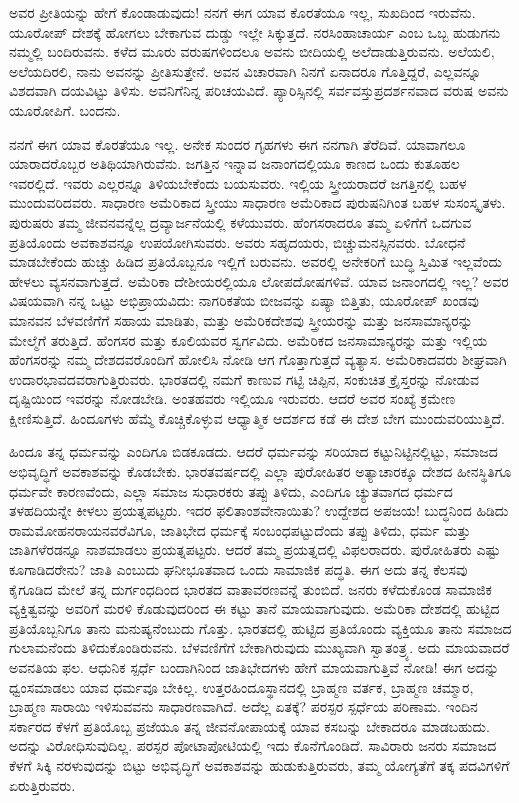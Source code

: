 ಅವರ ಪ್ರೀತಿಯನ್ನು ಹೇಗೆ ಕೊಂಡಾಡುವುದು! ನನಗೆ ಈಗ ಯಾವ ಕೊರತೆಯೂ ಇಲ್ಲ, ಸುಖದಿಂದ ಇರುವೆನು. ಯೂರೋಪ್ ದೇಶಕ್ಕೆ ಹೋಗಲು ಬೇಕಾಗುವ ದುಡ್ಡು ಇಲ್ಲೇ ಸಿಕ್ಕುತ್ತದೆ. ನರಸಿಂಹಾಚಾರ್ಯ ಎಂಬ ಒಬ್ಬ ಹುಡುಗನು ನಮ್ಮಲ್ಲಿ ಬಂದಿರುವನು. ಕಳೆದ ಮೂರು ವರುಷಗಳಿಂದಲೂ ಅವನು ಬೀದಿಯಲ್ಲಿ ಅಲೆದಾಡುತ್ತಿರುವನು. ಅಲೆಯಲಿ, ಅಲೆಯದಿರಲಿ, ನಾನು ಅವನನ್ನು ಪ್ರೀತಿಸುತ್ತೇನೆ. ಅವನ ವಿಚಾರವಾಗಿ ನಿನಗೆ ಏನಾದರೂ ಗೊತ್ತಿದ್ದರೆ, ಎಲ್ಲವನ್ನೂ ವಿಶದವಾಗಿ ದಯವಿಟ್ಟು ತಿಳಿಸು. ಅವನಿಗೆ\break ನಿನ್ನ ಪರಿಚಯವಿದೆ. ಪ್ಯಾರಿಸ್ಸಿನಲ್ಲಿ ಸರ್ವವಸ್ತುಪ್ರದರ್ಶನವಾದ ವರುಷ ಅವನು ಯೂರೋಪಿಗೆ. ಬಂದನು.

ನನಗೆ ಈಗ ಯಾವ ಕೊರತೆಯೂ ಇಲ್ಲ. ಅನೇಕ ಸುಂದರ ಗೃಹಗಳು ಈಗ ನನಗಾಗಿ ತೆರೆದಿವೆ. ಯಾವಾಗಲೂ ಯಾರಾದರೊಬ್ಬರ ಅತಿಥಿಯಾಗಿರುವೆನು. ಜಗತ್ತಿನ ಇನ್ನಾವ ಜನಾಂಗದಲ್ಲಿಯೂ ಕಾಣದ ಒಂದು ಕುತೂಹಲ ಇವರಲ್ಲಿದೆ. ಇವರು ಎಲ್ಲರನ್ನೂ ತಿಳಿಯಬೇಕೆಂದು ಬಯಸುವರು. ಇಲ್ಲಿಯ ಸ್ತ್ರೀಯರಾದರೆ ಜಗತ್ತಿನಲ್ಲಿ ಬಹಳ ಮುಂದುವರಿದವರು. ಸಾಧಾರಣ ಅಮೆರಿಕಾದ ಸ್ತ್ರೀಯು ಸಾಧಾರಣ ಅಮೆರಿಕಾದ ಪುರುಷನಿಗಿಂತ ಬಹಳ ಸುಸಂಸ್ಕೃತಳು. ಪುರುಷರು ತಮ್ಮ ಜೀವನವನ್ನೆಲ್ಲ ದ್ರವ್ಯಾರ್ಜನೆಯಲ್ಲಿ ಕಳೆಯುವರು. ಹೆಂಗಸರಾದರೂ ತಮ್ಮ ಏಳಿಗೆಗೆ ಒದಗುವ ಪ್ರತಿಯೊಂದು ಅವಕಾಶವನ್ನೂ ಉಪಯೋಗಿಸುವರು. ಅವರು ಸಹೃದಯರು, ಬಿಚ್ಚುಮನಸ್ಸಿನವರು. ಬೋಧನೆ ಮಾಡಬೇಕೆಂದು ಹುಚ್ಚು ಹಿಡಿದ ಪ್ರತಿಯೊಬ್ಬನೂ ಇಲ್ಲಿಗೆ ಬರುವನು. ಅವರಲ್ಲಿ ಅನೇಕರಿಗೆ ಬುದ್ಧಿ ಸ್ತಿಮಿತ ಇಲ್ಲವೆಂದು ಹೇಳಲು ವ್ಯಸನವಾಗುತ್ತದೆ. ಅಮೆರಿಕಾ ದೇಶೀಯರಲ್ಲಿಯೂ ಲೋಪದೋಷಗಳಿವೆ. ಯಾವ ಜನಾಂಗದಲ್ಲಿ ಇಲ್ಲ? ಅವರ ವಿಷಯವಾಗಿ ನನ್ನ ಒಟ್ಟು ಅಭಿಪ್ರಾಯವಿದು: ನಾಗರಿಕತೆಯ ಬೀಜವನ್ನು ಏಷ್ಯಾ ಬಿತ್ತಿತು, ಯೂರೋಪ್ ಖಂಡವು ಮಾನವನ ಬೆಳವಣಿಗೆಗೆ ಸಹಾಯ ಮಾಡಿತು, ಮತ್ತು ಅಮೆರಿಕದೇಶವು ಸ್ತ್ರೀಯರನ್ನು ಮತ್ತು ಜನಸಾಮಾನ್ಯರನ್ನು ಮೇಲ್ಮೆಗೆ ತರುತ್ತಿದೆ. ಹೆಂಗಸರ ಮತ್ತು ಕೂಲಿಯವರ ಸ್ವರ್ಗವಿದು. ಅಮೆರಿಕದ ಜನಸಾಮಾನ್ಯರನ್ನು ಮತ್ತು ಇಲ್ಲಿಯ ಹೆಂಗಸರನ್ನು ನಮ್ಮ ದೇಶದವರೊಂದಿಗೆ ಹೋಲಿಸಿ ನೋಡಿ ಆಗ ಗೊತ್ತಾಗುತ್ತದೆ ವ್ಯತ್ಯಾಸ. ಅಮೆರಿಕಾದವರು ಶೀಘ್ರವಾಗಿ ಉದಾರಭಾವದವರಾಗುತ್ತಿರುವರು. ಭಾರತದಲ್ಲಿ ನಮಗೆ ಕಾಣುವ ಗಟ್ಟಿ ಚಿಪ್ಪಿನ, ಸಂಕುಚಿತ ಕ್ರೈಸ್ತರನ್ನು ನೋಡುವ ದೃಷ್ಟಿಯಿಂದ ಇವರನ್ನು ನೋಡಬೇಡಿ. ಅಂತಹವರು ಇಲ್ಲಿಯೂ ಇರುವರು. ಆದರೆ ಅವರ ಸಂಖ್ಯೆ ಕ್ರಮೇಣ ಕ್ಷೀಣಿಸುತ್ತಿದೆ. ಹಿಂದೂಗಳು ಹೆಮ್ಮೆ ಕೊಚ್ಚಿಕೊಳ್ಳುವ ಆಧ್ಯಾತ್ಮಿಕ ಆದರ್ಶದ ಕಡೆ ಈ ದೇಶ ಬೇಗ ಮುಂದುವರಿಯುತ್ತಿದೆ.

ಹಿಂದೂ ತನ್ನ ಧರ್ಮವನ್ನು ಎಂದಿಗೂ ಬಿಡಕೂಡದು. ಆದರೆ ಧರ್ಮವನ್ನು ಸರಿಯಾದ ಕಟ್ಟುನಿಟ್ಟಿನಲ್ಲಿಟ್ಟು, ಸಮಾಜದ ಅಭಿವೃದ್ಧಿಗೆ ಅವಕಾಶವನ್ನು ಕೊಡಬೇಕು. ಭಾರತವರ್ಷದಲ್ಲಿ ಎಲ್ಲಾ ಪುರೋಹಿತರ ಅತ್ಯಾಚಾರಕ್ಕೂ ದೇಶದ ಹೀನಸ್ಥಿತಿಗೂ ಧರ್ಮವೇ ಕಾರಣವೆಂದು, ಎಲ್ಲಾ ಸಮಾಜ ಸುಧಾರಕರು ತಪ್ಪು ತಿಳಿದು, ಎಂದಿಗೂ ಚ್ಯುತವಾಗದ ಧರ್ಮದ ತಳಹದಿಯನ್ನೇ ಕೀಳಲು ಪ್ರಯತ್ನಪಟ್ಟರು. ಇದರ ಫಲಿತಾಂಶವೇನಾಯಿತು? ಉದ್ದೇಶದ ಅಪಜಯ! ಬುದ್ಧನಿಂದ ಹಿಡಿದು ರಾಮಮೋಹನರಾಯನವರೆವಿಗೂ, ಜಾತಿಭೇದ ಧರ್ಮಕ್ಕೆ ಸಂಬಂಧಪಟ್ಟುದೆಂದು ತಪ್ಪು ತಿಳಿದು, ಧರ್ಮ ಮತ್ತು ಜಾತಿಗಳೆರಡನ್ನೂ ನಾಶಮಾಡಲು ಪ್ರಯತ್ನಪಟ್ಟರು. ಆದರೆ ತಮ್ಮ ಪ್ರಯತ್ನದಲ್ಲಿ ವಿಫಲರಾದರು. ಪುರೋಹಿತರು ಎಷ್ಟು ಕೂಗಾಡಿದರೇನು? ಜಾತಿ ಎಂಬುದು ಘನೀಭೂತವಾದ ಒಂದು ಸಾಮಾಜಿಕ ಪದ್ಧತಿ. ಈಗ ಅದು ತನ್ನ ಕೆಲಸವು ಕೈಗೂಡಿದ ಮೇಲೆ ತನ್ನ ದುರ್ಗಂಧದಿಂದ ಭಾರತದ ವಾತಾವರಣವನ್ನೆ ತುಂಬಿದೆ. ಜನರು ಕಳೆದುಕೊಂಡ ಸಾಮಾಜಿಕ ವ್ಯಕ್ತಿತ್ವವನ್ನು ಅವರಿಗೆ ಮರಳಿ ಕೊಡುವುದರಿಂದ ಈ ಕಟ್ಟು ತಾನೆ ಮಾಯವಾಗುವುದು. ಅಮೆರಿಕಾ ದೇಶದಲ್ಲಿ ಹುಟ್ಟಿದ ಪ್ರತಿಯೊಬ್ಬನಿಗೂ ತಾನು ಮನುಷ್ಯನೆಂಬುದು ಗೊತ್ತು. ಭಾರತದಲ್ಲಿ ಹುಟ್ಟಿದ ಪ್ರತಿಯೊಂದು ವ್ಯಕ್ತಿಯೂ ತಾನು ಸಮಾಜದ ಗುಲಾಮನೆಂದು ತಿಳಿದುಕೊಂಡಿರುವನು. ಬೆಳವಣಿಗೆಗೆ ಬೇಕಾಗಿರುವುದು ಮುಖ್ಯವಾಗಿ ಸ್ವಾತಂತ್ರ್ಯ. ಅದು ಮಾಯವಾದರೆ ಅವನತಿಯ ಫಲ. ಆಧುನಿಕ ಸ್ಪರ್ಧೆ ಬಂದಾಗಿನಿಂದ ಜಾತಿಭೇದಗಳು ಹೇಗೆ ಮಾಯವಾಗುತ್ತಿವೆ ನೋಡಿ! ಈಗ ಅದನ್ನು ಧ್ವಂಸಮಾಡಲು ಯಾವ ಧರ್ಮವೂ ಬೇಕಿಲ್ಲ. ಉತ್ತರಹಿಂದೂಸ್ಥಾನದಲ್ಲಿ ಬ್ರಾಹ್ಮಣ ವರ್ತಕ, ಬ್ರಾಹ್ಮಣ ಚಮ್ಮಾರ, ಬ್ರಾಹ್ಮಣ ಸಾರಾಯಿ ಇಳಿಸುವವನು ಸಾಧಾರಣವಾಗಿದೆ. ಅದೆಲ್ಲ ಏತಕ್ಕೆ? ಪರಸ್ಪರ ಸ್ಪರ್ಧೆಯ ಪರಿಣಾಮ. ಇಂದಿನ ಸರ್ಕಾರದ ಕೆಳಗೆ ಪ್ರತಿಯೊಬ್ಬ ಪ್ರಜೆಯೂ ತನ್ನ ಜೀವನೋಪಾಯಕ್ಕೆ ಯಾವ ಕಸಬನ್ನು ಬೇಕಾದರೂ ಮಾಡಬಹುದು. ಅದನ್ನು ವಿರೋಧಿಸುವುದಿಲ್ಲ. ಪರಸ್ಪರ ಪೋಟಾಪೋಟಿಯಲ್ಲಿ ಇದು ಕೊನೆಗೊಂಡಿದೆ. ಸಾವಿರಾರು ಜನರು ಸಮಾಜದ ಕೆಳಗೆ ಸಿಕ್ಕಿ ನರಳುವುದನ್ನು ಬಿಟ್ಟು ಅಭಿವೃದ್ಧಿಗೆ ಅವಕಾಶವನ್ನು ಹುಡುಕುತ್ತಿರುವರು, ತಮ್ಮ ಯೋಗ್ಯತೆಗೆ ತಕ್ಕ ಪದವಿಗಳಿಗೆ ಏರುತ್ತಿರುವರು.

